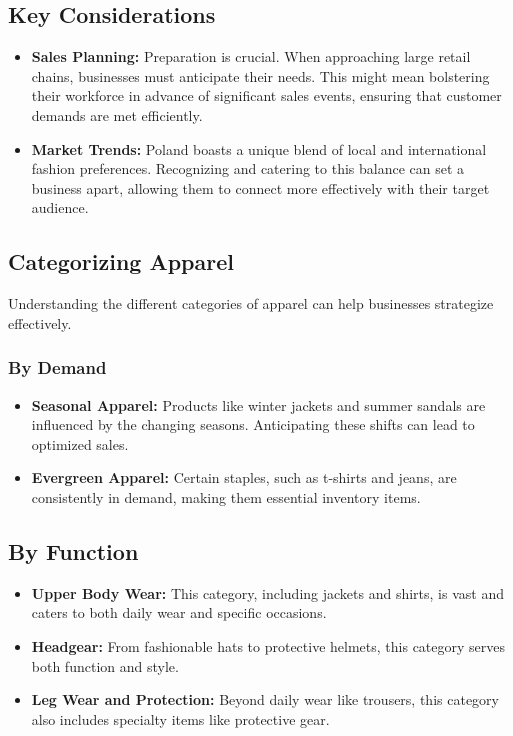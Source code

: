\documentclass{article}
\begin{document}
\subsection{Key Considerations}
\begin{itemize}
    \item \textbf{Sales Planning:} Preparation is crucial. When approaching large retail chains, businesses must anticipate their needs. This might mean bolstering their workforce in advance of significant sales events, ensuring that customer demands are met efficiently.
    \item \textbf{Market Trends:} Poland boasts a unique blend of local and international fashion preferences. Recognizing and catering to this balance can set a business apart, allowing them to connect more effectively with their target audience.
\end{itemize}

\subsection{Categorizing Apparel}
Understanding the different categories of apparel can help businesses strategize effectively.
\subsubsection{By Demand}
\begin{itemize}
    \item \textbf{Seasonal Apparel:} Products like winter jackets and summer sandals are influenced by the changing seasons. Anticipating these shifts can lead to optimized sales.
    \item \textbf{Evergreen Apparel:} Certain staples, such as t-shirts and jeans, are consistently in demand, making them essential inventory items.
\end{itemize}
\subsection{By Function}
\begin{itemize}
    \item \textbf{Upper Body Wear:} This category, including jackets and shirts, is vast and caters to both daily wear and specific occasions.
    \item \textbf{Headgear:} From fashionable hats to protective helmets, this category serves both function and style.
    \item \textbf{Leg Wear and Protection:} Beyond daily wear like trousers, this category also includes specialty items like protective gear.
\end{itemize}
\end{document}
